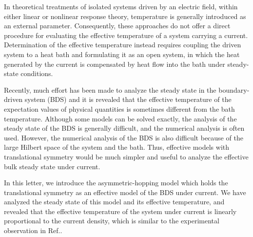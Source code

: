 \documentclass[a4paper, amsfonts, amssymb, amsmath, reprint, showkeys, nofootinbib, twoside,superscriptaddress, prl]{revtex4-2}
\begin{document}
In theoretical treatments of isolated systems driven by an electric field, within either linear or nonlinear response theory, temperature is generally introduced as an external parameter. Consequently, these approaches do not offer a direct procedure for evaluating the effective temperature of a system carrying a current. Determination of the effective temperature instead requires coupling the driven system to a heat bath and formulating it as an open system, in which the heat generated by the current is compensated by heat flow into the bath under steady-state conditions.

Recently, much effort has been made to analyze the steady state in the boundary-driven system (BDS)\cite{Wichterich2007-mg, Prosen2008-bm, Prosen2011-wp, Prosen2014-xx, Landi2022-gk, Kempa2026-fm} and it is revealed that the effective temperature of the expectation values of physical quantities is sometimes different from the bath temperature\cite{Landi2022-gk}. Although some models can be solved exactly, the analysis of the steady state of the BDS is generally difficult, and the numerical analysis is often used. However, the numerical analysis of the BDS is also difficult because of the large Hilbert space of the system and the bath. Thus, effective models with translational symmetry would be much simpler and useful to analyze the effective bulk steady state under current.

In this letter, we introduce the asymmetric-hopping model which holds the translational symmetry as an effective model of the BDS under current. We have analyzed the steady state of this model and its effective temperature, and revealed that the effective temperature of the system under current is linearly proportional to the current density, which is similar to the experimental observation in Ref.\cite{Ootsuki2025-em}. 

\
\end{document}
